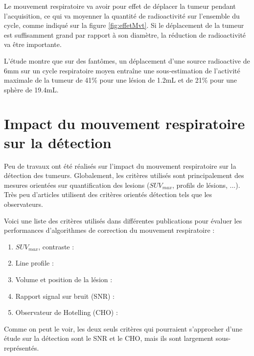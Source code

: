 Le mouvement respiratoire va avoir pour effet de déplacer la tumeur pendant l'acquisition, ce qui va moyenner la quantité de radioactivité sur l'ensemble du cycle, comme indiqué sur la figure \ref{fig:effetMvt}. Si le déplacement de la tumeur est suffisamment grand par rapport à son diamètre, la réduction de radioactivité va être importante.

L'étude \cite{boucher2004respiratory} montre que sur des fantômes, un déplacement d'une source radioactive de 6mm sur un cycle respiratoire moyen entraîne une sous-estimation de l'activité maximale de la tumeur de 41\% pour une lésion de 1.2mL et de 21\% pour une sphère de 19.4mL.


\section{Impact du mouvement respiratoire sur la détection}

Peu de travaux ont été réalisés sur l'impact du mouvement respiratoire sur la détection des tumeurs. Globalement, les critères utilisés sont principalement des mesures orientées sur quantification des lesions ($SUV_{max}$, profils de lésions, ...). Très peu d'articles utilisent des critères orientés détection tels que les observateurs.

Voici une liste des critères utilisés dans différentes publications pour évaluer les performances d'algorithmes de correction du mouvement respiratoire :

\begin{enumerate}
 \item  $SUV_{max}$, contraste : \cite{GuopingChang2010Implementation} \cite{lamare2007list} \cite{nehmeh2002effect} \cite{detorie2008quantitative}
 \item Line profile : \cite{GuopingChang2010Implementation} \cite{Thielemans2006Lesion} \cite{lamare2007list}
 \item Volume et position de la lésion : \cite{GuopingChang2010Implementation} \cite{lamare2007list} \cite{nehmeh2002effect}
 \item Rapport signal sur bruit (SNR) : \cite{GuopingChang2010Implementation}
 \item Observateur de Hotelling (CHO) : \cite{Thielemans2006Lesion}
\end{enumerate}

Comme on peut le voir, les deux seuls critères qui pourraient s'approcher d'une étude sur la détection sont le SNR et le CHO, mais ils sont largement sous-représentés. 

